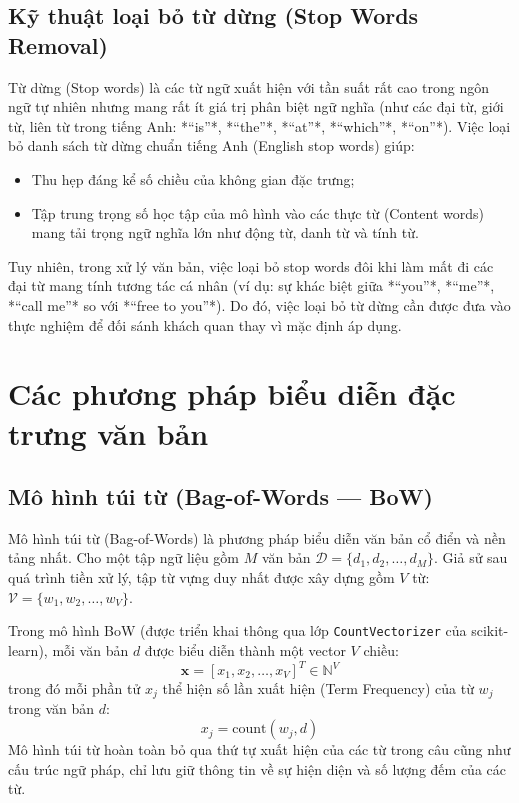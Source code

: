 \subsection{Kỹ thuật loại bỏ từ dừng (Stop Words Removal)}
Từ dừng (Stop words) là các từ ngữ xuất hiện với tần suất rất cao trong ngôn ngữ tự nhiên nhưng mang rất ít giá trị phân biệt ngữ nghĩa (như các đại từ, giới từ, liên từ trong tiếng Anh: *“is”*, *“the”*, *“at”*, *“which”*, *“on”*). Việc loại bỏ danh sách từ dừng chuẩn tiếng Anh (English stop words) giúp:
\begin{itemize}
    \item Thu hẹp đáng kể số chiều của không gian đặc trưng;
    \item Tập trung trọng số học tập của mô hình vào các thực từ (Content words) mang tải trọng ngữ nghĩa lớn như động từ, danh từ và tính từ.
\end{itemize}
Tuy nhiên, trong xử lý văn bản, việc loại bỏ stop words đôi khi làm mất đi các đại từ mang tính tương tác cá nhân (ví dụ: sự khác biệt giữa *“you”*, *“me”*, *“call me”* so với *“free to you”*). Do đó, việc loại bỏ từ dừng cần được đưa vào thực nghiệm để đối sánh khách quan thay vì mặc định áp dụng.

\section{Các phương pháp biểu diễn đặc trưng văn bản}
\label{sec:bieu-dien-dac-trung}

\subsection{Mô hình túi từ (Bag-of-Words --- BoW)}
Mô hình túi từ (Bag-of-Words) là phương pháp biểu diễn văn bản cổ điển và nền tảng nhất. Cho một tập ngữ liệu gồm $M$ văn bản $\mathcal{D} = \{d_1, d_2, \dots, d_M\}$. Giả sử sau quá trình tiền xử lý, tập từ vựng duy nhất được xây dựng gồm $V$ từ: $\mathcal{V} = \{w_1, w_2, \dots, w_V\}$.

Trong mô hình BoW (được triển khai thông qua lớp \texttt{CountVectorizer} của scikit-learn), mỗi văn bản $d$ được biểu diễn thành một vector $V$ chiều:
\begin{equation}
\mathbf{x} = [x_1, x_2, \dots, x_V]^T \in \mathbb{N}^V
\end{equation}
trong đó mỗi phần tử $x_j$ thể hiện số lần xuất hiện (Term Frequency) của từ $w_j$ trong văn bản $d$:
\begin{equation}
x_j = \text{count}(w_j, d)
\end{equation}
Mô hình túi từ hoàn toàn bỏ qua thứ tự xuất hiện của các từ trong câu cũng như cấu trúc ngữ pháp, chỉ lưu giữ thông tin về sự hiện diện và số lượng đếm của các từ.

